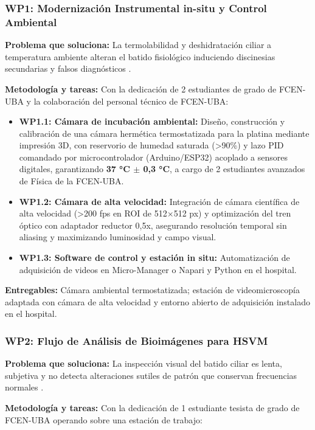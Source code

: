 \documentclass[11pt,letterpaper]{article}
\begin{document}
\subsubsection*{WP1: Modernización Instrumental in-situ y Control Ambiental}

\textbf{Problema que soluciona:} La termolabilidad y deshidratación ciliar a temperatura ambiente alteran el batido fisiológico induciendo discinesias secundarias y falsos diagnósticos \cite{Bricmont2021}.

\textbf{Metodología y tareas:} Con la dedicación de 2 estudiantes de grado de FCEN-UBA y la colaboración del personal técnico de FCEN-UBA:

\begin{itemize}[leftmargin=*,noitemsep,topsep=1pt]
    \item \textbf{WP1.1: Cámara de incubación ambiental:} Diseño, construcción y calibración de una cámara hermética termostatizada para la platina mediante impresión 3D, con reservorio de humedad saturada (>90\%) y lazo PID comandado por microcontrolador (Arduino/ESP32) acoplado a sensores digitales, garantizando \textbf{37 °C $\pm$ 0,3 °C}, a cargo de 2 estudiantes avanzados de Física de la FCEN-UBA.
    \item \textbf{WP1.2: Cámara de alta velocidad:} Integración de cámara científica de alta velocidad (>200 fps en ROI de 512$\times$512 px) y optimización del tren óptico con adaptador reductor 0,5x, asegurando resolución temporal sin aliasing y maximizando luminosidad y campo visual.
    \item \textbf{WP1.3: Software de control y estación in situ:} Automatización de adquisición de videos en Micro-Manager o Napari y Python en el hospital.
\end{itemize}

\textbf{Entregables:} Cámara ambiental termostatizada; estación de videomicroscopía adaptada con cámara de alta velocidad y entorno abierto de adquisición instalado en el hospital.

\subsubsection*{WP2: Flujo de Análisis de Bioimágenes para HSVM}

\textbf{Problema que soluciona:} La inspección visual del batido ciliar es lenta, subjetiva y no detecta alteraciones sutiles de patrón que conservan frecuencias normales \cite{Shapiro2015,Bricmont2021}.

\textbf{Metodología y tareas:} Con la dedicación de 1 estudiante tesista de grado de FCEN-UBA operando sobre una estación de trabajo:
\end{document}
